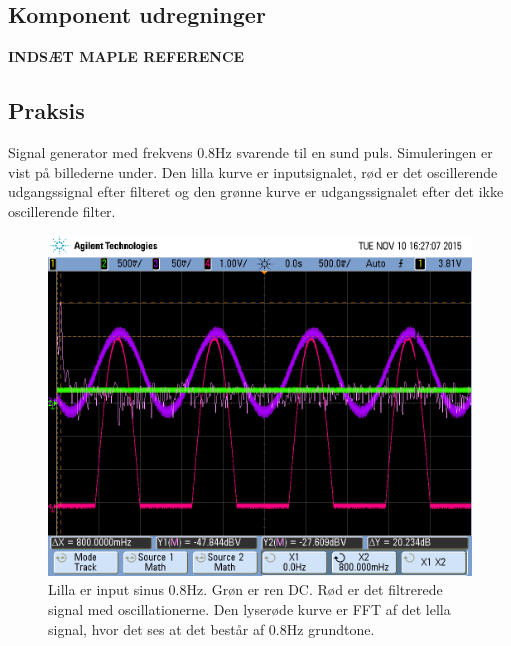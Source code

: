 \subsection{Komponent udregninger}
\textbf{INDSÆT MAPLE REFERENCE}

\subsection{Praksis}
Signal generator med frekvens 0.8Hz svarende til en sund puls. Simuleringen er vist på billederne under. Den lilla kurve er inputsignalet, rød er det oscillerende udgangssignal efter filteret og den grønne kurve er udgangssignalet efter det ikke oscillerende filter.

\begin{figure}[H]
	\includegraphics[width=\textwidth]{billeder/scope_9.png}
	\caption{Lilla er input sinus 0.8Hz. Grøn er ren DC. Rød er det filtrerede signal med oscillationerne. Den lyserøde kurve er FFT af det lella signal, hvor det ses at det består af 0.8Hz grundtone.}\label{fig:filterone}
\end{figure}

